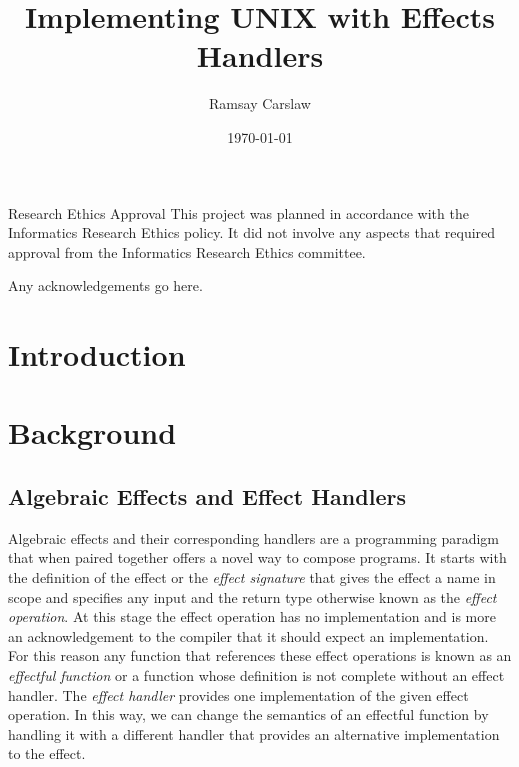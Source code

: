 \documentclass[logo,bsc,singlespacing,parskip]{infthesis}
\begin{document}
\begin{preliminary}

\title{Implementing UNIX with Effects Handlers}
\author{Ramsay Carslaw}


\date{\today}


\maketitle

\newenvironment{ethics}
   {\begin{frontenv}{Research Ethics Approval}{\LARGE}}
   {\end{frontenv}\newpage}

\begin{ethics}
This project was planned in accordance with the Informatics Research
Ethics policy. It did not involve any aspects that required approval
from the Informatics Research Ethics committee.

\standarddeclaration
\end{ethics}

\begin{acknowledgements}
  Any acknowledgements go here.
\end{acknowledgements}

\tableofcontents

\end{preliminary}

\chapter{Introduction}

\chapter{Background}

\section{Algebraic Effects and Effect Handlers}

Algebraic effects \cite{plotkin2002computational} and their corresponding
handlers \cite{plotkin2009handlers} \cite{pretnar2015introduction} are a
programming paradigm that when paired together offers a novel way to compose
programs. It starts with the definition of the effect or the \emph{effect
signature} that gives the effect a name in scope and specifies any input and
the return type otherwise known as the \emph{effect operation}. At this stage
the effect operation has no implementation and is more an acknowledgement to
the compiler that it should expect an implementation. For this reason any
function that references these effect operations is known as an \emph{effectful
function} or a function whose definition is not complete without an effect
handler. The \emph{effect handler} provides one implementation of the given
effect operation. In this way, we can change the semantics of an effectful
function by handling it with a different handler that provides an alternative
implementation to the effect. 
\end{document}
